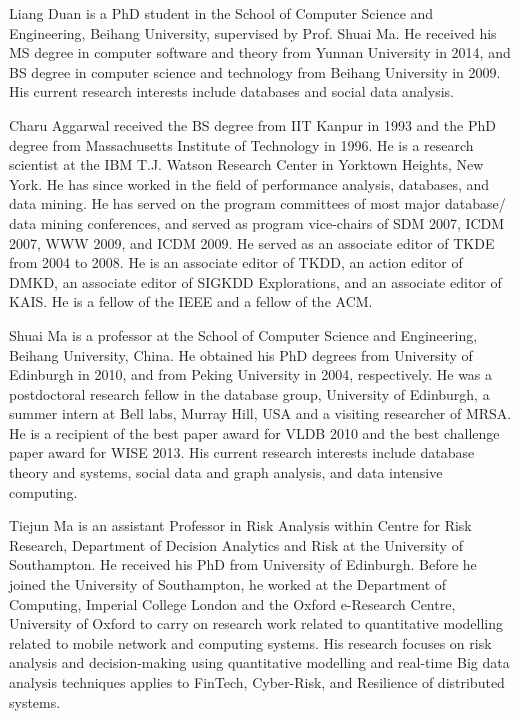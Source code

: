 \vspace{-9ex}
\begin{IEEEbiography}{Liang Duan} is a PhD student in the School of Computer Science and Engineering, Beihang University, supervised by Prof. Shuai Ma. He received his MS degree in computer software and theory from Yunnan University in 2014, and BS degree in computer science and technology from Beihang University in 2009. His current research interests include databases and social data analysis.
\end{IEEEbiography}
\vspace{-8ex}
\begin{IEEEbiography}{Charu Aggarwal} received the BS degree
from IIT Kanpur in 1993 and the PhD degree
from Massachusetts Institute of Technology in
1996. He is a research scientist at the IBM T.J.
Watson Research Center in Yorktown Heights,
New York. He has since worked in the field of
performance analysis, databases, and data mining.
He has served on the
program committees of most major database/
data mining conferences, and served as program vice-chairs of SDM 2007, ICDM 2007, WWW 2009, and ICDM
2009. He served as an associate editor of TKDE from 2004 to 2008. He is an
associate editor of TKDD, an action editor of DMKD, an associate editor of SIGKDD Explorations, and an associate editor of KAIS. He is a fellow of the IEEE and a fellow of the ACM.
\end{IEEEbiography}
\vspace{-8ex}
\begin{IEEEbiography}{Shuai Ma} is a professor at the School of Computer Science and Engineering, Beihang University, China.
He obtained his PhD degrees from University of Edinburgh in 2010, and from
Peking University in 2004, respectively.
He was a postdoctoral research fellow in the database group, University of Edinburgh, a summer intern at Bell labs, Murray Hill, USA and a visiting researcher of MRSA.
He is a recipient of the best paper award for VLDB 2010 and the best challenge paper award for WISE 2013. His current research interests include database theory and systems, social data and graph analysis, and data intensive computing.
\end{IEEEbiography}
\vspace{-8ex}
\begin{IEEEbiography}{Tiejun Ma} is an assistant Professor in Risk Analysis within Centre for Risk Research, Department of Decision Analytics and Risk at the University of Southampton. He received his PhD from University of Edinburgh. Before he joined the University of Southampton, he worked at the Department of Computing, Imperial College London and the Oxford e-Research Centre, University of Oxford to carry on research work related to quantitative modelling related to mobile network and computing systems. His research focuses on risk analysis and decision-making using quantitative modelling and real-time Big data analysis techniques applies to FinTech, Cyber-Risk, and Resilience of distributed systems.
\end{IEEEbiography}
